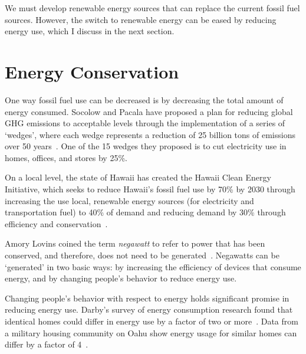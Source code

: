 We must develop renewable energy sources that can replace the current fossil fuel sources. However, the switch to renewable energy can be eased by reducing energy use, which I discuss in the next section.


\section{Energy Conservation}

One way fossil fuel use can be decreased is by decreasing the total amount of energy consumed. Socolow and Pacala have proposed a plan for reducing global GHG emissions to acceptable levels through the implementation of a series of `wedges', where each wedge represents a reduction of 25 billion tons of \COtwo emissions over 50 years~\cite{Socolow2008}. One of the 15 wedges they proposed is to cut electricity use in homes, offices, and stores by 25\%.

On a local level, the state of Hawaii has created the Hawaii Clean Energy Initiative, which seeks to reduce Hawaii's fossil fuel use by 70\% by 2030 through increasing the use local, renewable energy sources (for electricity and transportation fuel) to 40\% of demand and reducing demand by 30\% through efficiency and conservation~\cite{HCEI-website}.

Amory Lovins coined the term \emph{negawatt} to refer to power that has been conserved, and therefore, does not need to be generated~\cite{Kolbert2007Mr-Green}. Negawatts can be `generated' in two basic ways: by increasing the efficiency of devices that consume energy, and by changing people's behavior to reduce energy use.

Changing people's behavior with respect to energy holds significant promise in reducing energy use. Darby's survey of energy consumption research found that identical homes could differ in energy use by a factor of two or more~\cite{darby-review-2006}. Data from a military housing community on Oahu show energy usage for similar homes can differ by a factor of 4~\cite{Norton2010ZeroEnergyHomes}.



